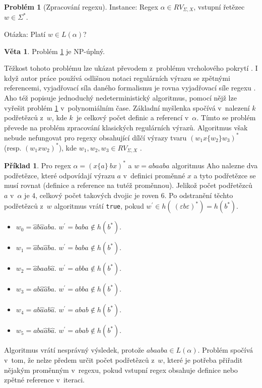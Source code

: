 \documentclass[thesis=B,czech]{FITthesis}[2019/12/23]
\theoremstyle{definition}
\newtheorem{example}{Příklad}[chapter]
\newtheorem{theorem}{Věta}[chapter]
\newtheorem{problem}{Problém}[chapter]
\begin{document}
\begin{problem}[Zpracování regexu]\label{prob}
Instance: Regex $\alpha \in RV_{\Sigma, X}$, vstupní řetězec $w \in \Sigma^\ast$.

Otázka: Platí $w \in L\left(\alpha\right)$?
\end{problem}

\begin{theorem}
Problém \ref{prob} je NP-úplný.
\end{theorem}
Těžkost tohoto problému lze ukázat převodem z~problému vrcholového pokrytí \cite[s. 289]{alfred2014algorithms}. I když autor práce používá odlišnou notaci regulárních výrazu se zpětnými referencemi, vyjadřovací síla daného formalismu je rovna vyjadřovací síle regexu \cite[lemma 23 na s. 39]{berglund}. Aho též popisuje jednoduchý nedeterministický algoritmus, pomocí nějž lze vyřešit problém \ref{prob} v~polynomiálním čase. Základní myšlenka spočívá v~nalezení $k$ podřetězců z~$w$, kde $k$~je celkový počet definic a referencí v~$\alpha$. Tímto se problém převede na problém zpracování klasických regulárních výrazů. Algoritmus však nebude nefungovat pro regexy obsahující dílčí výrazy tvaru $\left(w_1 x\{ w_2 \} w_3 \right)^\ast$ (resp. $\left(w_1 x w_2 \right)^\ast$), kde $w_1, w_2, w_3 \in RV_{\Sigma, X}$ \cite[s. 83]{schmidregex}. 
\begin{example}
Pro regex $\alpha=\left(x\{a\} \ b x \right)^\ast$ a $w = abaaba$ algoritmus Aho nalezne dva podřetězce, které odpovídají výrazu $a$ v~definici proměnné $x$ a tyto podřetězce se musí rovnat (definice a reference na tutéž proměnnou). Jelikož počet podřetězců $a$ v~$\alpha$ je 4, celkový počet takových dvojic je roven 6. Po odstranění těchto podřetězců z~$w$ algoritmus vrátí \texttt{true}, pokud $w^\prime \in h( \ (\varepsilon b \varepsilon )^\ast) = h(b^\ast)$.
\begin{itemize}
	\item{$w_0 = \overbrace{a}b\overbrace{a}aba$. $w^\prime = baba \notin h(b^\ast)$. }
	\item{$w_1 =  \overbrace{a}ba \overbrace{a}ba$. $w^\prime = baba \notin h(b^\ast)$. }
	\item{$w_2 =  \overbrace{a}baab \overbrace{a}$. $w^\prime = abba \notin h(b^\ast)$. }
	\item{$w_3 = ab \overbrace{a} \overbrace{a}ba$. $w^\prime = abba \notin h(b^\ast)$.}
	\item{$w_4 = ab \overbrace{a}ab \overbrace{a}$. $w^\prime = abab \notin h(b^\ast)$.}
	\item{$w_5 = aba \overbrace{a}b \overbrace{a}$. $w^\prime = abab \notin h(b^\ast)$.}
\end{itemize} 
Algoritmus vrátí nesprávný výsledek, protože $abaaba \in L(\alpha)$. Problém spočívá v~tom, že nelze předem určit počet podřetězců z~$w$, které je potřeba přiřadit nějakým proměnným v~regexu, pokud vstupní regex obsahuje definice nebo zpětné reference v~iteraci. 
\end{example} 
\end{document}
